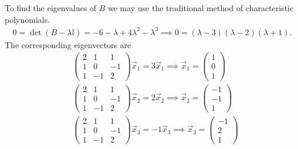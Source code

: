 \documentclass{article}
\theoremstyle{definition}
\begin{document}
\begin{enumerate}[label=(\alph*)]
	To find the eigenvalues of $B$ we may use the traditional method of characteristic polynomials. 
	\begin{align*}
	0 = \det(B-\lambda \mathbb{I}) = -6-\lambda +4 \lambda^2 - \lambda^3 \implies 0 = (\lambda-3)(\lambda-2)(\lambda+1).
	\end{align*}
	The corresponding eigenvectors are
	\begin{align*}
	&\begin{pmatrix}
	2 & 1 & 1 \\
	1 & 0 & -1\\
	1 & -1 & 2
	\end{pmatrix}\vec{x}_1 = 3\vec{x}_1 \implies \vec{x}_1 = \begin{pmatrix}
	1 \\ 0 \\ 1
	\end{pmatrix}\\
	&\begin{pmatrix}
	2 & 1 & 1 \\
	1 & 0 & -1\\
	1 & -1 & 2
	\end{pmatrix}\vec{x}_2 = 2\vec{x}_2 \implies \vec{x}_2 = \begin{pmatrix}
	-1 \\ -1 \\ 1
	\end{pmatrix}\\
	&\begin{pmatrix}
	2 & 1 & 1 \\
	1 & 0 & -1\\
	1 & -1 & 2
	\end{pmatrix}\vec{x}_3 = -1\vec{x}_3 \implies \vec{x}_3 = \begin{pmatrix}
	-1 \\ 2 \\ 1
	\end{pmatrix}
	\end{align*}
	

\end{enumerate}
\end{document}
